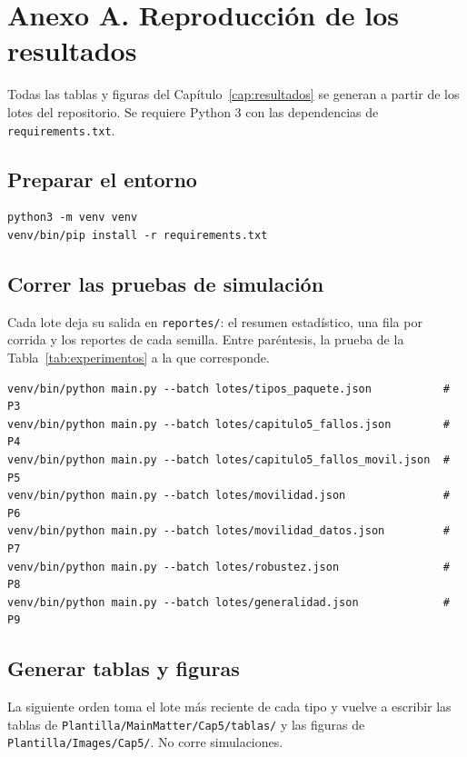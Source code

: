
\section*{Anexo A. Reproducción de los resultados}

Todas las tablas y figuras del Capítulo~\ref{cap:resultados} se generan a partir de los lotes del
repositorio. Se requiere Python 3 con las dependencias de \texttt{requirements.txt}.

\subsection*{Preparar el entorno}

\begin{verbatim}
python3 -m venv venv
venv/bin/pip install -r requirements.txt
\end{verbatim}

\subsection*{Correr las pruebas de simulación}

Cada lote deja su salida en \texttt{reportes/}: el resumen estadístico, una fila por corrida y los
reportes de cada semilla. Entre paréntesis, la prueba de la Tabla~\ref{tab:experimentos} a la que
corresponde.

\begin{verbatim}
venv/bin/python main.py --batch lotes/tipos_paquete.json           # P3
venv/bin/python main.py --batch lotes/capitulo5_fallos.json        # P4
venv/bin/python main.py --batch lotes/capitulo5_fallos_movil.json  # P5
venv/bin/python main.py --batch lotes/movilidad.json               # P6
venv/bin/python main.py --batch lotes/movilidad_datos.json         # P7
venv/bin/python main.py --batch lotes/robustez.json                # P8
venv/bin/python main.py --batch lotes/generalidad.json             # P9
\end{verbatim}

\subsection*{Generar tablas y figuras}

La siguiente orden toma el lote más reciente de cada tipo y vuelve a escribir las tablas de
\texttt{Plantilla/MainMatter/Cap5/tablas/} y las figuras de \texttt{Plantilla/Images/Cap5/}. No
corre simulaciones.

